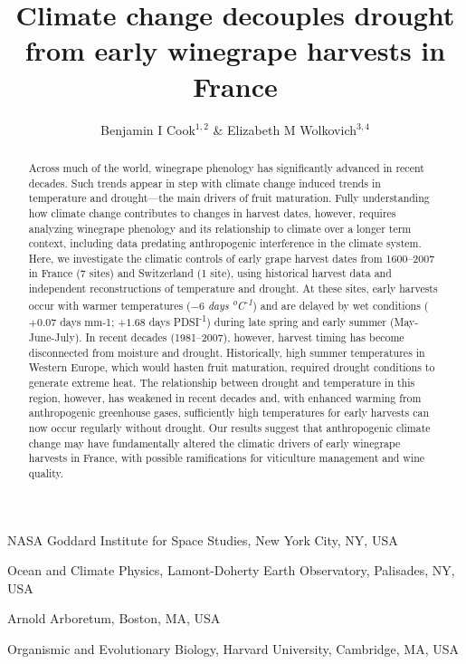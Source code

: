 \documentclass[final]{nature}
\title{Climate change decouples drought from early winegrape harvests in France} %
\author{Benjamin I Cook$^{1,2}$ \& Elizabeth M Wolkovich$^{3,4}$}
\begin{document}
\maketitle

\begin{affiliations}
 \item NASA Goddard Institute for Space Studies, New York City, NY, USA
 \item Ocean and Climate Physics, Lamont-Doherty Earth Observatory, Palisades, NY, USA
 \item Arnold Arboretum, Boston, MA, USA
 \item Organismic and Evolutionary Biology, Harvard University, Cambridge, MA, USA
\end{affiliations}

\begin{abstract}
Across much of the world, winegrape phenology has significantly advanced in recent decades\cite{Duchene:2005bd,Seguin2005,webb2011}. Such trends appear in step with climate change induced trends in temperature and drought---the main drivers of fruit maturation. Fully understanding how climate change contributes to changes in harvest dates, however, requires analyzing winegrape phenology and its relationship to climate over a longer term context, including data predating anthropogenic interference in the climate system. Here, we investigate the climatic controls of early grape harvest dates from 1600--2007 in France (7 sites) and Switzerland (1 site), using historical harvest data\cite{Daux2012} and independent reconstructions of temperature\cite{Luterbacher2004} and drought\cite{CookOWDA2015,Pauling2006}. At these sites, early harvests occur with warmer temperatures ($-6$ \emph{days \textsuperscript{o}C\textsuperscript{-1}}) and are delayed by wet conditions ($+0.07$ days mm{-1}; $+1.68$ days PDSI\textsuperscript{-1}) during late spring and early summer (May-June-July). In recent decades (1981--2007), however, harvest timing has become disconnected from moisture and drought. Historically, high summer temperatures in Western Europe, which would hasten fruit maturation, required drought conditions to generate extreme heat. The relationship between drought and temperature in this region, however, has weakened in recent decades and, with enhanced warming from anthropogenic greenhouse gases, sufficiently high temperatures for early harvests can now occur regularly without drought. Our results suggest that anthropogenic climate change may have fundamentally altered the climatic drivers of early winegrape harvests in France, with possible ramifications for viticulture management and wine quality. 

\end{abstract}
\end{document}
